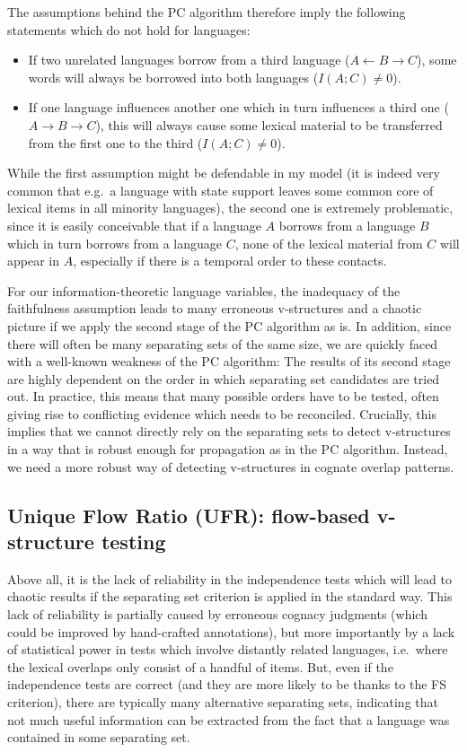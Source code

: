 The assumptions behind the PC algorithm therefore imply the following statements which do not hold for languages: 
\begin{itemize}
 \item If two unrelated languages borrow from a third language ($A \leftarrow B \rightarrow C$),
 some words will always be borrowed into both languages ($I(A;C) \neq 0$).
 \item If one language influences another one which in turn influences a third one ($A \rightarrow B \rightarrow C$),
 this will always cause some lexical material to be transferred from the first one to the third ($I(A;C) \neq 0$).
\end{itemize}
While the first assumption might be defendable in my model (it is indeed very common that e.g.\ a language with state support leaves some common core of lexical items in all minority languages), the second one is extremely problematic, since it is easily conceivable that if a language $A$ borrows from a language $B$ which in turn borrows from a language $C$, none of the lexical material from $C$ will appear in $A$, especially if there is a temporal order to these contacts.

For our information-theoretic language variables, the inadequacy of the faithfulness assumption leads to many erroneous v-structures and a chaotic picture if we apply the second stage of the PC algorithm as is. In addition, since there will often be many separating sets of the same size, we are quickly faced with a well-known weakness of the PC algorithm: The results of its second stage are highly dependent on the order in which separating set candidates are tried out. In practice, this means that many possible orders have to be tested, often giving rise to conflicting evidence which needs to be reconciled. Crucially, this implies that we cannot directly rely on the separating sets to detect v-structures in a way that is robust enough for propagation as in the PC algorithm. Instead, we need a more robust way of detecting v-structures in cognate overlap patterns.

\subsection{Unique Flow Ratio (UFR): flow-based v-structure testing}
Above all, it is the lack of reliability in the independence tests which will lead to chaotic results if the separating set criterion is applied in the standard way. This lack of reliability is partially caused by erroneous cognacy judgments (which could be improved by hand-crafted annotations), but more importantly by a lack of statistical power in tests which involve distantly related languages, i.e.\ where the lexical overlaps only consist of a handful of items. But, even if the independence tests are correct (and they are more likely to be thanks to the FS criterion), there are typically many alternative separating sets, indicating that not much useful information can be extracted from the fact that a language was contained in some separating set.

